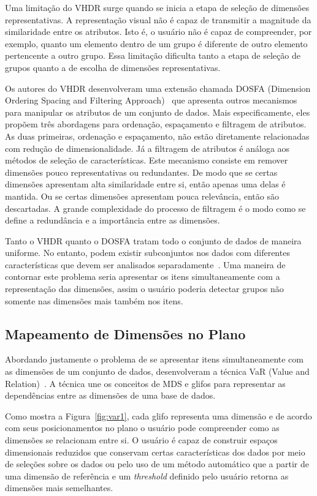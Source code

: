 Uma limitação do VHDR surge quando se inicia a etapa de seleção de dimensões representativas. A representação visual não é capaz de transmitir a magnitude da similaridade entre os atributos. Isto é, o usuário não é capaz de compreender, por exemplo, quanto um elemento dentro de um grupo é diferente de outro elemento pertencente a outro grupo. Essa limitação dificulta tanto a etapa de seleção de grupos quanto a de escolha de dimensões representativas.

Os autores do VHDR desenvolveram uma extensão chamada DOSFA (Dimension Ordering Spacing and Filtering Approach)~\cite{DOSFA} que apresenta outros mecanismos para manipular os atributos de um conjunto de dados. Mais especificamente, eles propõem três abordagens para ordenação, espaçamento e filtragem de atributos. As duas primeiras, ordenação e espaçamento, não estão diretamente relacionadas com redução de dimensionalidade. Já a filtragem de atributos é análoga aos métodos de seleção de características. Este mecanismo consiste em remover dimensões pouco representativas ou redundantes. De modo que se certas dimensões apresentam alta similaridade entre si, então apenas uma delas é mantida. Ou se certas dimensões apresentam pouca relevância, então são descartadas. A grande complexidade do processo de filtragem é o modo como se define a redundância e a importância entre as dimensões. 

Tanto o VHDR quanto o DOSFA tratam todo o conjunto de dados de maneira uniforme. No entanto, podem existir subconjuntos nos dados com diferentes características que devem ser analisados separadamente~\cite{May2011}. Uma maneira de contornar este problema seria apresentar os itens simultaneamente com a representação das dimensões, assim o usuário poderia detectar grupos não somente nas dimensões mais também nos itens.

\subsection{Mapeamento de Dimensões no Plano}

Abordando justamente o problema de se apresentar itens simultaneamente com as dimensões de um conjunto de dados, \citeauthor{Yang2004} desenvolveram a técnica VaR (Value and Relation)~\cite{Yang2004}. A técnica une os conceitos de MDS e glifos para representar as dependências entre as dimensões de uma base de dados. 

Como mostra a Figura~\ref{fig:var1}, cada glifo representa uma dimensão e de acordo com seus posicionamentos no plano o usuário pode compreender como as dimensões se relacionam entre si. 
O usuário é capaz de construir espaços dimensionais reduzidos que conservam certas características dos dados por meio de seleções sobre os dados ou pelo uso de um método automático que a partir de uma dimensão de referência e um \emph{threshold} definido pelo usuário retorna as dimensões mais semelhantes.

